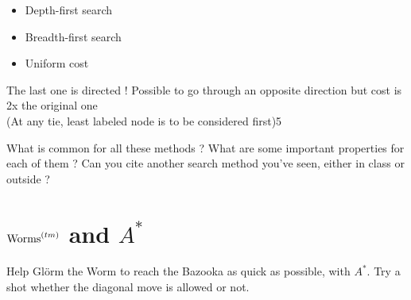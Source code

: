 \documentclass[11pt,a4paper,BCOR12mm, headexclude, footexclude, twoside, openright]{scrartcl}
\newcommand*{\TakeFourierOrnament}[1]{{%
\fontencoding{U}\fontfamily{futs}\selectfont\char#1}}
\newcommand*{\danger}{\TakeFourierOrnament{66}}
\numberwithin{equation}{section} %
\numberwithin{figure}{section} %
\numberwithin{table}{section} %
\begin{document}
\begin{itemize}
	\item Depth-first search
    \item Breadth-first search
    \item Uniform cost
\end{itemize}

\danger The last one is directed ! Possible to go through an opposite direction but cost is 2x the original one\\
(At any tie, least labeled node is to be considered first)5

What is common for all these methods ? What are some important properties for each of them ? Can you cite another search method you've seen, either in class or outside ?

\section{$\textnormal{Worms}^{(tm)}$ and $A^*$}
Help Glörm the Worm to reach the Bazooka as quick as possible, with $A^*$. Try a shot whether the diagonal move is allowed or not.
\end{document}
